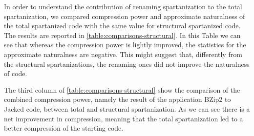 In order to understand the contribution of renaming spartanization to the total spartanization, 
we compared compression power and approximate naturalness of the total spartanized code 
with the same value for structural spartanized code. 
The results are reported in \cref{table:comparisons-structural}. In this Table we 
can see that whereas the compression power 
is lightly improved, the statistics for the approximate naturalness are negative.
This might suggest that, differently from the structural spartanizations, the renaming ones 
did not improve the naturalness of code.

The third column of \cref{table:comparisons-structural} show the comparison of the combined
compression power, namely the result of the application BZip2 to Jacked code, 
between total and structural spartanization. As we can see there is a net improvement in 
compression, meaning that the total spartanization led to a better compression of the starting code.

